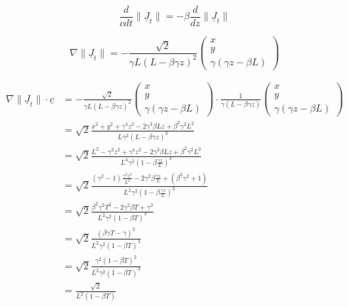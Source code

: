 \begin{equation}
	\frac{d}{c dt} \|\underline{J}_t\|  = - \beta \frac{d}{ dz} \|\underline{J}_t\|
\end{equation}

\begin{equation}
	\nabla \|\underline{J}_t\| = - \frac{ \sqrt{2} }{\gamma L ( L - \beta \gamma z )^2 }
	\begin{pmatrix}
		x \\
		y \\
		\gamma (\gamma z - \beta L)
	\end{pmatrix}
\end{equation}

\begin{equation}
	\begin{aligned}
	\nabla \|\underline{J}_t\| \cdot \hat{\underline{c}} &=  - \frac{ \sqrt{2} }{\gamma L ( L - \beta \gamma z )^2 }
	\begin{pmatrix}
		x \\
		y \\
		\gamma (\gamma z - \beta L)
	\end{pmatrix}
	\cdot
	\frac{1}{ \gamma \left( L - \beta \gamma z \right) }
		\begin{pmatrix}
			x \\
			y \\
			\gamma \left(\gamma z - \beta L \right)
		\end{pmatrix} \\
	&= \sqrt{2} \frac{ x^2+y^2 + \gamma^4z^2-2\gamma^3\beta Lz + \beta^2\gamma^2L^2}{ L \gamma^2  ( L - \beta \gamma z )^3 } \\
	&= \sqrt{2} \frac{ L^2 - \gamma^2z^2 + \gamma^4z^2-2\gamma^3\beta Lz + \beta^2\gamma^2 L^2}{ L^4 \gamma^2  ( 1 - \beta \frac{\gamma z }{L} )^3 } \\
	&= \sqrt{2} \frac{ (\gamma^2-1) \frac{\gamma^2 z^2}{L^2} -2\gamma^2\beta \frac{\gamma z}{L} + (\beta^2\gamma^2 + 1 )}{ L^2 \gamma^2  ( 1 - \beta \frac{\gamma z }{L} )^3 } \\
	&= \sqrt{2} \frac{ \beta^2\gamma^2 T^2 -2\gamma^2\beta T + \gamma^2 }{ L^2 \gamma^2  ( 1 - \beta T )^3 } \\
	&= \sqrt{2} \frac{ (\beta\gamma T - \gamma)^2 }{ L^2 \gamma^2  ( 1 - \beta T )^3 } \\
	&= \sqrt{2} \frac{ \gamma^2(1-\beta T)^2 }{ L^2 \gamma^2  ( 1 - \beta T )^3 } \\
	&=  \frac{ \sqrt{2} }{ L^2 ( 1 - \beta T ) }
	\end{aligned}
\end{equation}

